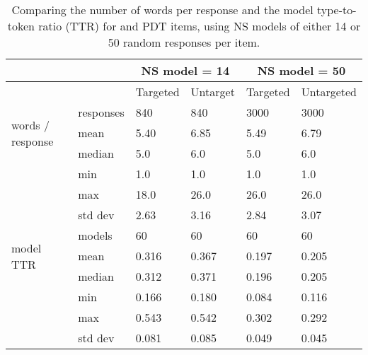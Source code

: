 \begin{table}[htb!]
\begin{center}
\setlength{\tabcolsep}{.6em}
\begin{tabular}{|l|l||l|l||l|l|}
\hline
 && \multicolumn{2}{c||}{NS model = 14} & \multicolumn{2}{c|}{NS model = 50} \\
\hline
	&	& Targeted 	& Untarget 	& Targeted 	& Untargeted  	\\
\hline
\multirow{3}{*}{\begin{sideways}words / response \end{sideways}} & responses & 840 & 840 & 3000 & 3000  \\
\cline{2-6}
& mean 		& 5.40 	& 6.85		& 5.49 	& 6.79	 \\
\cline{2-6}
& median 	& 5.0 	& 6.0		& 5.0 	& 6.0	\\
\cline{2-6}
& min 		& 1.0 	& 1.0		& 1.0 	& 1.0	 \\
\cline{2-6}
& max 		& 18.0 	& 26.0		& 26.0 	& 26.0	 \\
\cline{2-6}
& std dev 	& 2.63 	& 3.16		& 2.84 	& 3.07	 \\
\hline
\hline
\multirow{3}{*}{\begin{sideways} model TTR \end{sideways}} & models	& 60  & 60 & 60 & 60  \\
\cline{2-6}
& mean 		& 0.316 	& 0.367		& 0.197 	& 0.205	 \\
\cline{2-6}
& median 	& 0.312 	& 0.371		& 0.196 	& 0.205	\\
\cline{2-6}
& min 		& 0.166 	& 0.180		& 0.084 	& 0.116	 \\
\cline{2-6}
& max 		& 0.543 	& 0.542		& 0.302 	& 0.292	 \\
\cline{2-6}
& std dev 	& 0.081 	& 0.085		& 0.049 	& 0.045	 \\
\hline
\end{tabular}
\caption{\label{tab:targeting-model-stats}Comparing the number of words per response and the model type-to-token ratio (TTR) for  and  PDT items, using NS models of either 14 or 50 random responses per item.
}
\end{center}
\end{table}



